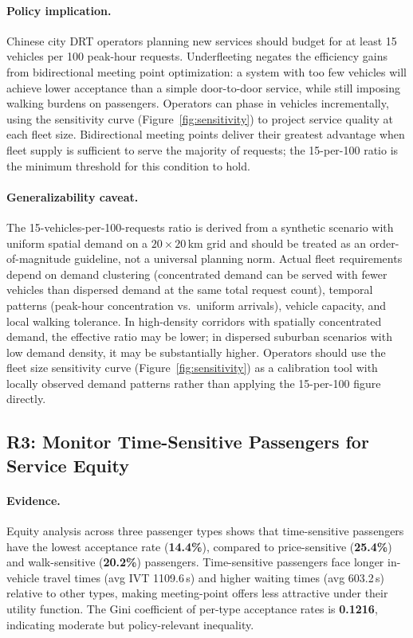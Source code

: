\paragraph{Policy implication.}
Chinese city DRT operators planning new services should budget for at least
15 vehicles per 100 peak-hour requests. Underfleeting negates the efficiency
gains from bidirectional meeting point optimization: a system with too few
vehicles will achieve lower acceptance than a simple door-to-door service,
while still imposing walking burdens on passengers. Operators can phase in
vehicles incrementally, using the sensitivity curve (Figure~\ref{fig:sensitivity})
to project service quality at each fleet size. Bidirectional meeting points
deliver their greatest advantage when fleet supply is sufficient to serve
the majority of requests; the 15-per-100 ratio is the minimum threshold for
this condition to hold.

\paragraph{Generalizability caveat.}
The 15-vehicles-per-100-requests ratio is derived from a synthetic scenario with
uniform spatial demand on a $20 \times 20$\,km grid and should be treated as an
order-of-magnitude guideline, not a universal planning norm.
Actual fleet requirements depend on demand clustering (concentrated demand can be
served with fewer vehicles than dispersed demand at the same total request count),
temporal patterns (peak-hour concentration vs.\ uniform arrivals), vehicle
capacity, and local walking tolerance.
In high-density corridors with spatially concentrated demand, the effective ratio
may be lower; in dispersed suburban scenarios with low demand density, it may be
substantially higher.
Operators should use the fleet size sensitivity curve (Figure~\ref{fig:sensitivity})
as a calibration tool with locally observed demand patterns rather than applying
the 15-per-100 figure directly.

\subsection{R3: Monitor Time-Sensitive Passengers for Service Equity}

\paragraph{Evidence.}
Equity analysis across three passenger types shows that time-sensitive
passengers have the lowest acceptance rate (\textbf{14.4\%}), compared to
price-sensitive (\textbf{25.4\%}) and walk-sensitive (\textbf{20.2\%})
passengers. Time-sensitive passengers face longer in-vehicle travel times
(avg IVT 1109.6\,s) and higher waiting times (avg 603.2\,s) relative to
other types, making meeting-point offers less attractive under their utility
function. The Gini coefficient of per-type acceptance rates is
\textbf{0.1216}, indicating moderate but policy-relevant inequality.

